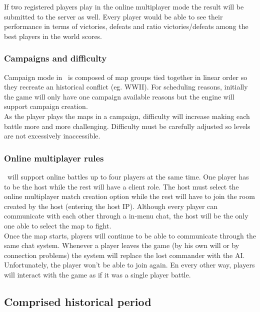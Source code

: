 If two registered players play in the online multiplayer mode the result will
be submitted to the server as well. Every player would be able to see their
performance in terms of victories, defeats and ratio victories/defeats among
the best players in the world scores.\\

\subsubsection{Campaigns and difficulty}

Campaign mode in \game\ is composed of map groups tied together in linear
order so they recreate an historical conflict (eg. WWII). For scheduling
reasons, initially the game will only have one campaign available reasons but
the engine will support campaign creation.\\

As the player plays the maps in a campaign, difficulty will increase making
each battle more and more challenging. Difficulty must be carefully adjusted so
levels are not excessively inaccessible.\\


\subsubsection{Online multiplayer rules}

\game\ will support online battles up to four players at the same time. One
player has to be the host while the rest will have a client role. The host must
select the online multiplayer match creation option while the rest will have to
join the room created by the host (entering the host IP). Although every player
can communicate with each other through a in-menu chat, the host will be the
only one able to select the map to fight.\\

Once the map starts, players will continue to be able to communicate through
the same chat system. Whenever a player leaves the game (by his own will or by
connection problems) the system will replace the lost commander with the AI.
Unfortunately, the player won't be able to join again. En every other way,
players will interact with the game as if it was a single player battle.\\

\subsection{Comprised historical period}

